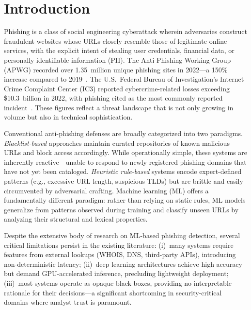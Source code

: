 \documentclass[conference]{IEEEtran}
\begin{document}
\section{Introduction}
\label{sec:intro}

Phishing is a class of social engineering cyberattack wherein adversaries 
construct fraudulent websites whose URLs closely resemble those of 
legitimate online services, with the explicit intent of stealing user 
credentials, financial data, or personally identifiable information (PII). 
The Anti-Phishing Working Group (APWG) recorded over 1.35~million unique 
phishing sites in 2022—a 150\% increase compared to 2019~\cite{apwg2022}. 
The U.S.\ Federal Bureau of Investigation's Internet Crime Complaint 
Center (IC3) reported cybercrime-related losses exceeding \$10.3~billion 
in 2022, with phishing cited as the most commonly reported 
incident~\cite{ic3_2022}. These figures reflect a threat landscape that 
is not only growing in volume but also in technical sophistication.

Conventional anti-phishing defenses are broadly categorized into two 
paradigms. \textit{Blacklist-based} approaches maintain curated repositories 
of known malicious URLs and block access accordingly. While operationally 
simple, these systems are inherently reactive—unable to respond to 
newly registered phishing domains that have not yet been cataloged. 
\textit{Heuristic rule-based} systems encode expert-defined patterns 
(e.g., excessive URL length, suspicious TLDs) but are brittle and easily 
circumvented by adversarial crafting. Machine learning (ML) offers a 
fundamentally different paradigm: rather than relying on static rules, 
ML models generalize from patterns observed during training and 
classify unseen URLs by analyzing their structural and lexical properties.

Despite the extensive body of research on ML-based phishing detection, 
several critical limitations persist in the existing literature: (i)~many 
systems require features from external lookups (WHOIS, DNS, third-party 
APIs), introducing non-deterministic latency; (ii)~deep learning 
architectures achieve high accuracy but demand GPU-accelerated inference, 
precluding lightweight deployment; (iii)~most systems operate as opaque 
black boxes, providing no interpretable rationale for their decisions—a 
significant shortcoming in security-critical domains where analyst trust 
is paramount.
\end{document}
